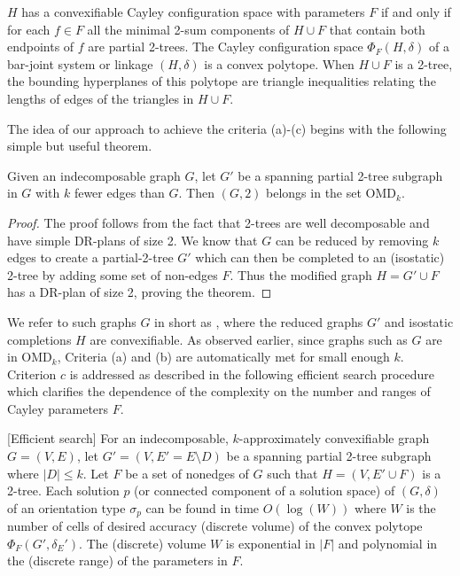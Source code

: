 \begin{theorem}\label{theorem:convexcayley}
    \cite{sitharam2010convex} $H$ has a convexifiable Cayley configuration space  with
    parameters $F$ if and only if for each $f\in F$  all the minimal
    2-sum components of $H\cup F$ that contain both endpoints of $f$
    are partial 2-trees. The Cayley configuration space
    $\Phi_F(H,\delta)$ of a bar-joint system or linkage $(H,\delta)$
    is a convex polytope. When $H\cup F$ is a 2-tree, the bounding
    hyperplanes of this polytope are triangle inequalities relating
    the lengths of edges of the triangles in $H\cup F$.
\end{theorem}

The idea of our approach to achieve the criteria (a)-(c) begins with
the following simple but useful theorem.

\begin{theorem}\label{theorem:omdk}
    Given an indecomposable graph $G$, let $G'$ be a spanning partial
    2-tree subgraph in $G$ with $k$ fewer edges than $G$. Then
    $(G,2)$ belongs in the set OMD$_k$.
\end{theorem}

\begin{proof}
The proof follows from the fact that 2-trees are well decomposable and
have simple DR-plans of size 2. We know that $G$ can be reduced by
removing $k$ edges to create a partial-2-tree $G'$ which can then be
completed to an (isostatic) 2-tree by adding some set of non-edges
$F$. Thus the modified graph $H = G'\cup F$ has  a DR-plan of size 2,
proving the theorem.
\end{proof}

We refer to such graphs $G$ in short as , where the reduced graphs $G'$ and isostatic
completions $H$ are convexifiable. As observed earlier, since graphs
such as $G$ are in OMD$_k$, Criteria (a) and (b) are automatically met
for small enough $k$. Criterion $c$ is addressed as described in the
following efficient search procedure which clarifies the dependence of
the complexity on the number and ranges  of Cayley parameters $F$.

\begin{theorem}\label{theorem:criterionc}
    [Efficient search]
    For an indecomposable, $k$-approximately convexifiable graph $G =
    (V,E)$, let $G' = (V,E' =E\setminus D)$ be a spanning partial
    2-tree subgraph where $|D| \le  k$. Let  $F$ be a set of nonedges
    of $G$ such that $H = (V, E'\cup F)$ is a 2-tree. Each solution
    $p$ (or connected component of a solution space) of $(G,\delta)$
    of an orientation type $\sigma_p$ can be found in time
    $O(\log(W))$ where $W$ is the number of cells of desired accuracy
    (discrete volume) of the convex polytope $\Phi_F(G',\delta_E')$.
    The (discrete) volume $W$ is exponential in $|F|$ and polynomial
    in the (discrete range) of the parameters in $F$.
\end{theorem}

